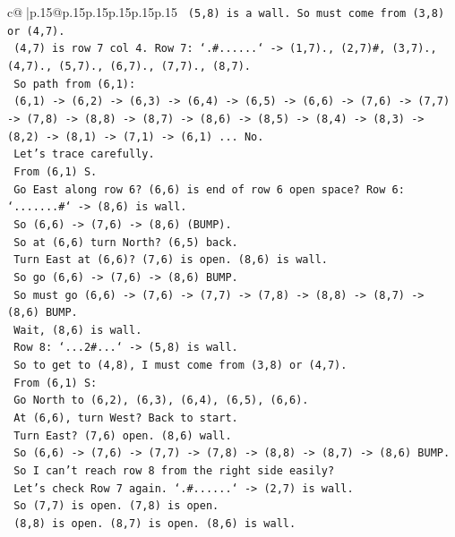 \documentclass{article}
\begin{document}
{\begin{supertabular}{c@{$\;$}|p{.15\linewidth}@{}p{.15\linewidth}p{.15\linewidth}p{.15\linewidth}p{.15\linewidth}p{.15\linewidth}}
{{{\texttt{      (5,8) is a wall. So must come from (3,8) or (4,7).} \\
\texttt{      (4,7) is row 7 col 4. Row 7: `.\#......` {-}> (1,7)., (2,7)\#, (3,7)., (4,7)., (5,7)., (6,7)., (7,7)., (8,7).} \\
\texttt{      So path from (6,1):} \\
\texttt{      (6,1) {-}> (6,2) {-}> (6,3) {-}> (6,4) {-}> (6,5) {-}> (6,6) {-}> (7,6) {-}> (7,7) {-}> (7,8) {-}> (8,8) {-}> (8,7) {-}> (8,6) {-}> (8,5) {-}> (8,4) {-}> (8,3) {-}> (8,2) {-}> (8,1) {-}> (7,1) {-}> (6,1) ... No.} \\
\texttt{      Let's trace carefully.} \\
\texttt{      From (6,1) S.} \\
\texttt{      Go East along row 6? (6,6) is end of row 6 open space? Row 6: `.......\#` {-}> (8,6) is wall.} \\
\texttt{      So (6,6) {-}> (7,6) {-}> (8,6) (BUMP).} \\
\texttt{      So at (6,6) turn North? (6,5) back.} \\
\texttt{      Turn East at (6,6)? (7,6) is open. (8,6) is wall.} \\
\texttt{      So go (6,6) {-}> (7,6) {-}> (8,6) BUMP.} \\
\texttt{      So must go (6,6) {-}> (7,6) {-}> (7,7) {-}> (7,8) {-}> (8,8) {-}> (8,7) {-}> (8,6) BUMP.} \\
\texttt{      Wait, (8,6) is wall.} \\
\texttt{      Row 8: `...2\#...` {-}> (5,8) is wall.} \\
\texttt{      So to get to (4,8), I must come from (3,8) or (4,7).} \\
\texttt{      From (6,1) S:} \\
\texttt{      Go North to (6,2), (6,3), (6,4), (6,5), (6,6).} \\
\texttt{      At (6,6), turn West? Back to start.} \\
\texttt{      Turn East? (7,6) open. (8,6) wall.} \\
\texttt{      So (6,6) {-}> (7,6) {-}> (7,7) {-}> (7,8) {-}> (8,8) {-}> (8,7) {-}> (8,6) BUMP.} \\
\texttt{      So I can't reach row 8 from the right side easily?} \\
\texttt{      Let's check Row 7 again. `.\#......` {-}> (2,7) is wall.} \\
\texttt{      So (7,7) is open. (7,8) is open.} \\
\texttt{      (8,8) is open. (8,7) is open. (8,6) is wall.} \\
}}}
\end{supertabular}}
\end{document}
